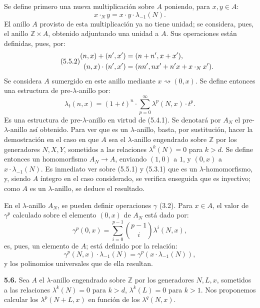 Se define primero una nueva multiplicación sobre \(A\) poniendo, para \(x,y\in A\):
\begin{equation}\tag{5.5.1}
  x\cdot_N y=x\cdot y\cdot\lambda_{-1}(N).
\end{equation}
El anillo \(A\) provisto de esta multiplicación ya no tiene unidad; se considera, pues, el anillo \(\mathbb Z\times A\), obtenido adjuntando una unidad a \(A\). Sus operaciones están definidas, pues, por:
\begin{equation}\tag{5.5.2}
\begin{aligned}
  (n,x)+(n',x')&=(n+n',x+x'),\\
  (n,x)\cdot(n',x')&=(nn',nx'+n'x+\sisi{x\cdot_N y}{x\cdot_N x'}).
\end{aligned}
\end{equation}
Se considera \(A\) sumergido en este anillo mediante \(x\rightsquigarrow(0,x)\). Se define entonces una estructura de pre-\(\lambda\)-anillo por:
\begin{equation}\tag{5.5.3}
  \lambda_t(n,x)=(1+t)^n\cdot\sum_{p=0}^{\infty}\lambda^p(N,x)\cdot t^p.
\end{equation}
Es una estructura de pre-\(\lambda\)-anillo en virtud de (5.4.1). Se denotará por \(A_N\) el pre-\(\lambda\)-anillo así obtenido. Para ver que es un \(\lambda\)-anillo, basta, por sustitución, hacer la demostración en el caso en que \(A\) sea el \(\lambda\)-anillo engendrado sobre \(\mathbb Z\) por los generadores \(N,X,Y\), sometidos a las relaciones \(\lambda^k(N)=0\) para \(k>d\). Se define entonces un homomorfismo \(A_N\to A\), enviando \((1,0)\) a \(1\), y \((0,x)\) a \(x\cdot\lambda_{-1}(N)\). Es inmediato ver sobre (5.5.1) y (5.3.1) que es un \(\lambda\)-homomorfismo, y, siendo \(A\) íntegro en el caso considerado, se verifica enseguida que es inyectivo; como \(A\) es un \(\lambda\)-anillo, se deduce el resultado.

En el \(\lambda\)-anillo \(A_N\), se pueden definir operaciones \(\gamma\) (3.2). Para \(x\in A\), el valor de \(\gamma^p\) calculado sobre el elemento \((0,x)\) de \(A_N\) está dado por:
\[
  \gamma^p(0,x)=\sum_{i=0}^{p-1}\binom{p-1}{i}\lambda^i(N,x),
\]
es, pues, un elemento de \(A\); está definido por la relación:
\begin{equation}\tag{5.5.4}
  \gamma^p(N,x)\cdot\lambda_{-1}(N)=\gamma^p(x\cdot\lambda_{-1}(N)),
\end{equation}
y los polinomios universales que de ella resultan.


\textbf{5.6.} Sea \(A\) el \(\lambda\)-anillo engendrado sobre \(\mathbb Z\) por los generadores \(N,L,x\), sometidos a las relaciones \(\lambda^k(N)=0\) para \(k>d\), \(\lambda^k(L)=0\) para \(k>1\). Nos proponemos calcular los \(\lambda^p(N+L,x)\) en función de los \(\lambda^q(N,x)\).

